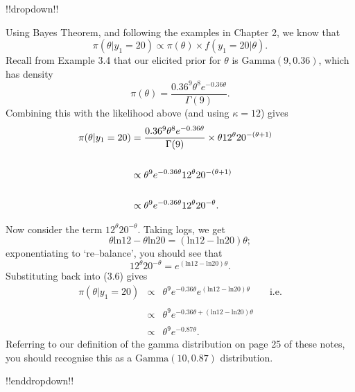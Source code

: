 {!!dropdown!!

Using Bayes Theorem, and following the examples in Chapter 2, we know that
        $$
        \pi(\theta|y_{1}=20) \propto \pi(\theta)\times f(y_1 =20 | \theta).
        $$
        Recall from Example 3.4 that our elicited prior for $\theta$ is $\mathrm{Gamma}(9,0.36)$, which has density
        $$
        \pi(\theta) = \frac{0.36^{9}\theta^{8}e^{-0.36\theta}}{\Gamma(9)}.
        $$
        Combining this with the likelihood above (and using $\kappa=12$) gives
        \begin{align}
        \pi(\theta|y_{1}=20)   &= \frac{0.36^{9}\theta^{8}e^{-0.36\theta}}{\Gamma(9)} \times \theta 12^{\theta}20^{-(\theta+1)} \notag \\
           &  \notag \\
                               &\propto \theta^{9} e^{-0.36 \theta} 12^{\theta} 20^{-(\theta+1)}  \notag \\
            & &\notag   \\
                               &\propto \theta^{9}e^{-0.36 \theta}12^{\theta} 20^{-\theta}.
        \end{align}
        
        Now consider the term $12^{\theta}20^{-\theta}$. Taking logs, we get
        $$
        \theta \mathrm{ln}12 - \theta \mathrm{ln}20  = (\mathrm{ln}12 - \mathrm{ln}20)\theta;
        $$
        exponentiating to `re--balance', you should see that 
        $$
        12^{\theta}20^{-\theta} = e^{(\mathrm{ln}12 - \mathrm{ln}20)\theta}.
        $$
        Substituting back into (3.6) gives
        \begin{eqnarray*}
          \pi(\theta|y_{1}=20)  &\propto& \theta^{9}e^{-0.36 \theta} e^{(\mathrm{ln}12 - \mathrm{ln}20)\theta}     \qquad \mathrm{i.e.}     \\
                   & & \\
                                &\propto& \theta^{9}e^{-0.36\theta +(\mathrm{ln}12-\mathrm{ln}20)\theta}    \\
                         & & \\
                                &\propto& \theta^{9}e^{-0.87 \theta}.
        \end{eqnarray*}
        Referring to our definition of the gamma distribution on page 25 of these notes, you should recognise this as a $\mathrm{Gamma}(10,0.87)$ distribution.

!!enddropdown!!

 

}
